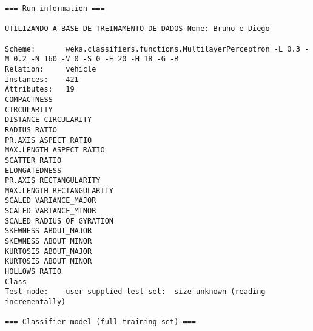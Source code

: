 \documentclass[
	article,			%
	11pt,				%
	oneside,			%
	a4paper,			%
	english,			%
	brazil,				%
	sumario=tradicional
	]{abntex2}
\begin{document}
\begin{lstlisting}
=== Run information ===

UTILIZANDO A BASE DE TREINAMENTO DE DADOS Nome: Bruno e Diego

Scheme:       weka.classifiers.functions.MultilayerPerceptron -L 0.3 -M 0.2 -N 160 -V 0 -S 0 -E 20 -H 18 -G -R
Relation:     vehicle
Instances:    421
Attributes:   19
COMPACTNESS
CIRCULARITY
DISTANCE CIRCULARITY
RADIUS RATIO
PR.AXIS ASPECT RATIO
MAX.LENGTH ASPECT RATIO
SCATTER RATIO
ELONGATEDNESS
PR.AXIS RECTANGULARITY
MAX.LENGTH RECTANGULARITY
SCALED VARIANCE_MAJOR
SCALED VARIANCE_MINOR
SCALED RADIUS OF GYRATION
SKEWNESS ABOUT_MAJOR
SKEWNESS ABOUT_MINOR
KURTOSIS ABOUT_MAJOR
KURTOSIS ABOUT_MINOR
HOLLOWS RATIO
Class
Test mode:    user supplied test set:  size unknown (reading incrementally)

=== Classifier model (full training set) ===


\end{lstlisting}
\end{document}
